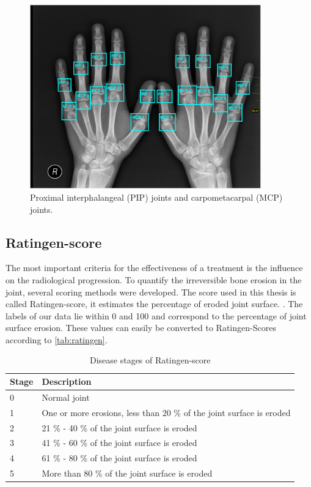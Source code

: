 \documentclass[12pt]{article}
\begin{document}
\begin{figure}[ht]
\includegraphics[width=10cm]{joints}	
\caption{Proximal interphalangeal (PIP) joints and carpometacarpal  (MCP) joints.}
\label{fig:joints}
\end{figure}

\subsection{Ratingen-score}
\label{subsec:ratingen}

The most important criteria for the effectiveness of a treatment is the influence on the radiological progression. To quantify the irreversible bone erosion in the joint, several scoring methods were developed. The score used in this thesis is called Ratingen-score, it estimates the percentage of eroded joint surface. \cite{rau_2007}. The labels of our data lie within 0 and 100 and correspond to the percentage of joint surface erosion. These values can easily be converted to Ratingen-Scores according to \autoref{tab:ratingen}.

\begin{table}[ht]
\centering
\caption{Disease stages of Ratingen-score \cite{rau_2007} }
\label{tab:ratingen}
\begin{tabular}{@{}ll@{}}
\toprule
Stage & Description                                                          \\ \midrule
0     & Normal joint                                                         \\
1     & One or more erosions, less than 20 \% of the joint surface is eroded \\
2     & 21 \% - 40 \% of the joint surface is eroded                         \\
3     & 41 \% - 60 \% of the joint surface is eroded                         \\
4     & 61 \% - 80 \% of the joint surface is eroded                         \\
5     & More than 80 \% of the joint surface is eroded                       \\ \bottomrule
\end{tabular}
\end{table}
\end{document}
